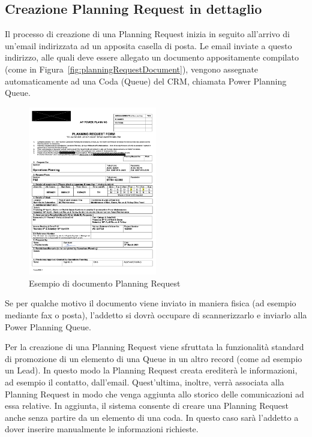 \subsection{Creazione Planning Request in dettaglio}
Il processo di creazione di una Planning Request inizia in seguito all'arrivo di un'email indirizzata ad un apposita casella di posta. Le email inviate a questo indirizzo, alle quali deve essere allegato un documento appositamente compilato (come in Figura~\vref{fig:planningRequestDocument}), vengono assegnate automaticamente ad una Coda (Queue) del CRM, chiamata Power Planning Queue.

\begin{figure}[ht!]
  \centering
  \includegraphics[width=0.5\textwidth]{planning-request-document.png}
  \caption{Esempio di documento Planning Request}
  \label{fig:planningRequestDocument}
\end{figure}

Se per qualche motivo il documento viene inviato in maniera fisica (ad esempio mediante fax o posta), l'addetto si dovrà occupare di scannerizzarlo e inviarlo alla Power Planning Queue.

Per la creazione di una Planning Request viene sfruttata la funzionalità standard di promozione di un elemento di una Queue in un altro record (come ad esempio un Lead). In questo modo la Planning Request creata erediterà le informazioni, ad esempio il contatto, dall'email. Quest'ultima, inoltre, verrà associata alla Planning Request in modo che venga aggiunta allo storico delle comunicazioni ad essa relative.
In aggiunta, il sistema consente di creare una Planning Request anche senza partire da un elemento di una coda. In questo caso sarà l'addetto a dover inserire manualmente le informazioni richieste. 

